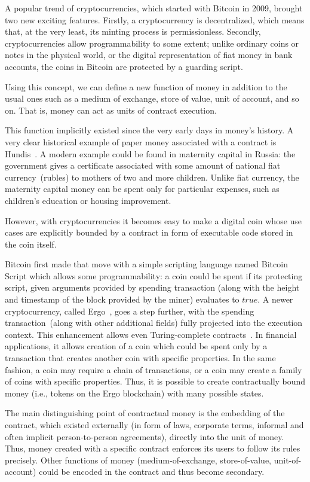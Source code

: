 \documentclass[]{llncs}   %
\begin{document}
A popular trend of cryptocurrencies, which started with Bitcoin in 2009, brought two new exciting features.
Firstly, a cryptocurrency is decentralized, which means that, at the very least, its minting process is permissionless.
Secondly, cryptocurrencies allow programmability to some extent; unlike ordinary coins or notes in the physical world, or the digital representation of fiat money in bank accounts, the coins in Bitcoin are protected by a guarding script. 

Using this concept, we can define a new function of money in addition to the usual ones such as a medium of exchange, store of value, unit of account, and so on. That is, money can act as units of contract execution.

This function implicitly existed since the very early days in money's history. A very clear historical example of paper money associated with a contract is Hundis~\cite{martin2009hundi}. A modern example could be found in
maternity capital in Russia: the government gives a certificate associated with some amount of national fiat currency~(rubles) to mothers of two and more children. Unlike fiat currency, the maternity capital money can be spent only for particular expenses, such as children's education or housing improvement.

However, with cryptocurrencies it becomes easy to make a digital coin whose use cases are
explicitly bounded by a contract in form of executable code stored in the coin itself.

Bitcoin first made that move with a simple scripting language named Bitcoin Script which allows some programmability: a coin could be spent if its protecting script, given arguments provided by spending transaction (along with the height and timestamp of the block provided by the miner) evaluates to $true$. A newer cryptocurrency, called Ergo~\cite{ergowp}, goes a step further, with the spending transaction~(along with other additional
fields) fully projected into the execution context. This enhancement allows even Turing-complete
contracts~\cite{chepurnoy2018self}. In financial applications, it allows creation of a coin which could be spent only by
a transaction that creates another coin with specific properties. In the same fashion, a coin may require a chain of
transactions, or a coin may create a family of coins with specific properties. Thus, it is possible to create contractually bound money (i.e., tokens on the Ergo blockchain) with many possible states. 

The main distinguishing point of contractual money is the embedding of the contract, which existed externally (in form of laws, corporate terms, informal and often implicit person-to-person agreements), directly into the unit of money. Thus, money created with a specific contract enforces its users to follow its rules precisely. Other functions of money (medium-of-exchange, store-of-value, unit-of-account) could be encoded in the contract and thus become secondary.
\end{document}
